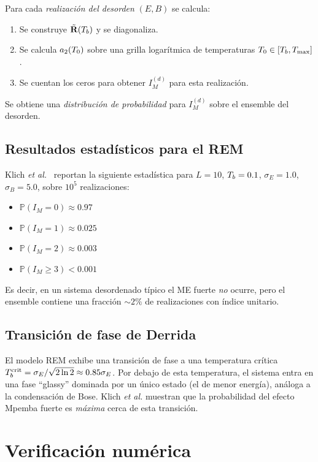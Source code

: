 \noindent Para cada \emph{realización del desorden} $(E, B)$ se calcula:
\begin{enumerate}
\item Se construye $\tilde{\vb{R}}(T_{b})$ y se diagonaliza.
\item Se calcula $a_{2}(T_{0})$ sobre una grilla logarítmica de temperaturas 
$T_{0} \in [T_{b}, T_{\max}]$.
\item Se cuentan los ceros para obtener $I_{M}^{(d)}$ para esta realización.
\end{enumerate}

\noindent Se obtiene una \emph{distribución de probabilidad} para $I_{M}^{(d)}$ 
sobre el ensemble del desorden.

\subsection{Resultados estadísticos para el REM}

Klich \emph{et al.}~\cite{klichraz2019} reportan la siguiente estadística para 
$L = 10$, $T_{b} = 0.1$, $\sigma_E = 1.0$, $\sigma_B = 5.0$, sobre $10^5$ 
realizaciones:
%
\begin{itemize}
\item $\mathbb{P}(I_M = 0) \approx 0.97$
\item $\mathbb{P}(I_M = 1) \approx 0.025$
\item $\mathbb{P}(I_M = 2) \approx 0.003$
\item $\mathbb{P}(I_M \geq 3) < 0.001$
\end{itemize}
%
\noindent Es decir, en un sistema desordenado típico el ME fuerte 
\emph{no} ocurre, pero el ensemble contiene una fracción $\sim 2\%$ de 
realizaciones con índice unitario.

\subsection{Transición de fase de Derrida}

El modelo REM exhibe una transición de fase a una temperatura crítica 
$T_{b}^{\mathrm{crit}} = \sigma_E / \sqrt{2 \ln 2} \approx 0.85 \sigma_E$. Por 
debajo de esta temperatura, el sistema entra en una fase ``glassy'' dominada por 
un único estado (el de menor energía), análoga a la condensación de Bose. 
Klich \emph{et al.} muestran que la probabilidad del efecto Mpemba fuerte es 
\emph{máxima} cerca de esta transición.

\section{Verificación numérica}

